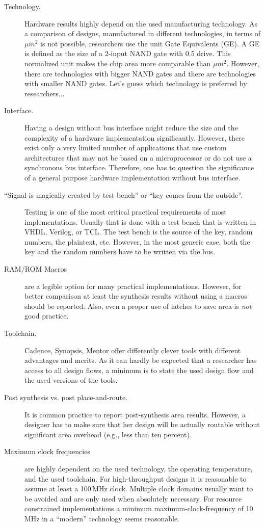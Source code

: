 \documentclass[runningheads]{llncs}
\begin{document}
\begin{description}
\item[Technology.] Hardware results highly depend on the used manufacturing technology. As a comparison of designs, manufactured in different technologies, in terms of ${\mu}m^2$ is not possible, researchers use the unit Gate Equivalents (GE). A GE is defined as the size of a 2-input NAND gate with 0.5 drive. This normalized unit makes the chip area more comparable than ${\mu}m^2$. However, there are technologies with bigger NAND gates and there are technologies with smaller NAND gates. Let's guess which technology is preferred by researchers...
\item[Interface.] Having a design without bus interface might reduce the size and the complexity of a hardware implementation significantly. However, there exist only a very limited number of applications that use custom architectures that may not be based on a microprocessor or do not use a synchronous bus interface. Therefore, one has to question the significance of a general purpose hardware implementation without bus interface.
\item[``Signal is magically created by test bench'' or ``key comes from the outside''.] Testing is one of the most critical practical requirements of most implementations. Usually that is done with a test bench that is written in VHDL, Verilog, or TCL. The test bench is the source of the key, random numbers, the plaintext, etc. However, in the most generic case, both the key and the random numbers have to be written via the bus.
\item[RAM/ROM Macros] are a legible option for many practical implementations. However, for better comparison at least the synthesis results without using a macros should be reported. Also, even a proper use of latches to save area is \emph{not} good practice.
\item[Toolchain.] Cadence, Synopsis, Mentor offer differently clever tools with different advantages and merits. As it can hardly be expected that a researcher has access to all design flows, a minimum is to state the used design flow and the used versions of the tools.
\item[Post synthesis vs. post place-and-route.] It is common practice to report post-synthesis area results. However, a designer has to make sure that her design will be actually routable without significant area overhead (e.g., less than ten percent).
\item[Maximum clock frequencies] are highly dependent on the used technology, the operating temperature, and the used toolchain. For high-throughput designs it is reasonable to assume at least a 100\,MHz clock. Multiple clock domains usually want to be avoided and are only used when absolutely necessary. For resource constrained implementations a minimum maximum-clock-frequency of 10\,MHz in a ``modern'' technology seems reasonable.

\end{description}
\end{document}
